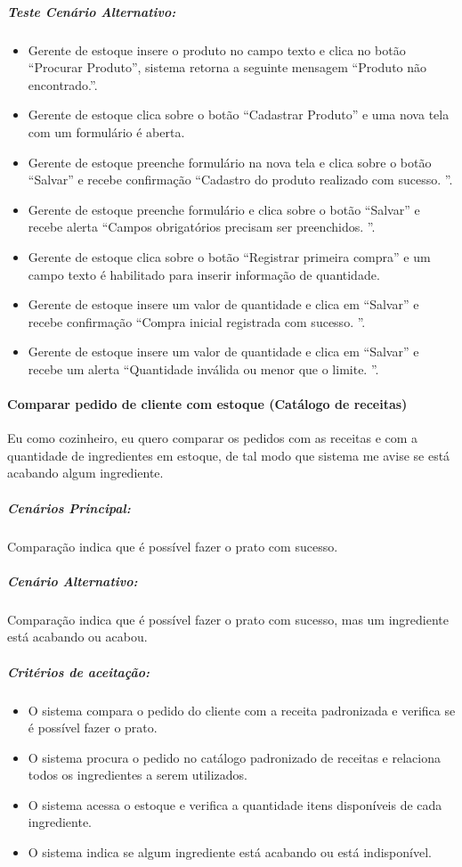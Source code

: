 \subparagraph{Teste Cenário Alternativo:}

\begin{itemize}
  \item Gerente de estoque insere o produto no campo texto e clica no botão “Procurar Produto”, sistema retorna a seguinte mensagem “Produto não encontrado.”.
\item Gerente de estoque clica sobre o botão “Cadastrar Produto” e uma nova tela com um formulário é aberta.
\item Gerente de estoque preenche formulário na nova tela e clica sobre o botão “Salvar” e recebe confirmação “Cadastro do produto realizado com sucesso. ”.
\item Gerente de estoque preenche formulário e clica sobre o botão “Salvar” e recebe alerta “Campos obrigatórios precisam ser preenchidos. ”.
\item Gerente de estoque clica sobre o botão “Registrar primeira compra” e um campo texto é habilitado para inserir informação de quantidade.
\item Gerente de estoque insere um valor de quantidade e clica em “Salvar” e recebe confirmação “Compra inicial registrada com sucesso. ”.
\item Gerente de estoque insere um valor de quantidade e clica em “Salvar” e recebe um alerta “Quantidade inválida ou menor que o limite. ”.

\end{itemize}

\paragraph{Comparar pedido de cliente com estoque (Catálogo de receitas)}

Eu como cozinheiro, eu quero comparar os pedidos com as receitas e com a quantidade de ingredientes em estoque, de tal modo que sistema me avise se está acabando algum ingrediente.

\subparagraph{Cenários Principal:}

Comparação indica que é possível fazer o prato com sucesso.

\subparagraph{Cenário Alternativo:}

Comparação indica que é possível fazer o prato com sucesso, mas um ingrediente está acabando ou acabou.

\subparagraph{Critérios de aceitação:}

\begin{itemize}
\item O sistema compara o pedido do cliente com a receita padronizada e verifica se é possível fazer o prato.  
\item O sistema procura o pedido no catálogo padronizado de receitas e relaciona todos os ingredientes a serem utilizados. 
\item O sistema acessa o estoque e verifica a quantidade itens disponíveis de cada ingrediente. 
\item O sistema indica se algum ingrediente está acabando ou está indisponível.
\end{itemize}

